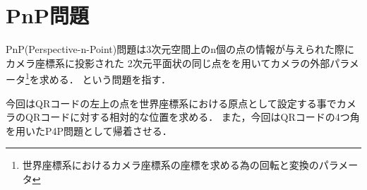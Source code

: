 \section{PnP問題}
PnP(Perspective-n-Point)問題は3次元空間上のn個の点の情報が与えられた際にカメラ座標系に投影された
2次元平面状の同じ点をを用いてカメラの外部パラメータ\footnote{世界座標系におけるカメラ座標系の座標を求める為の回転と変換のパラメータ}を求める．
という問題を指す．

今回はQRコードの左上の点を世界座標系における原点として設定する事でカメラのQRコードに対する相対的な位置を求める．
また，今回はQRコードの4つ角を用いたP4P問題として帰着させる．

